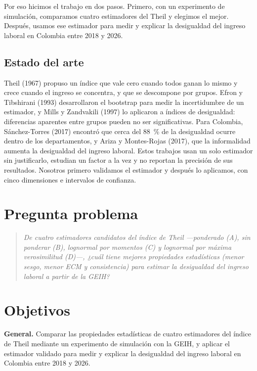 \documentclass[12pt,letterpaper]{article}
\begin{document}
Por eso hicimos el trabajo en dos pasos. Primero, con un experimento de simulación, comparamos cuatro estimadores del Theil y elegimos el mejor. Después, usamos ese estimador para medir y explicar la desigualdad del ingreso laboral en Colombia entre 2018 y 2026.

\subsection{Estado del arte}

Theil (1967) propuso un índice que vale cero cuando todos ganan lo mismo y crece cuando el ingreso se concentra, y que se descompone por grupos. Efron y Tibshirani (1993) desarrollaron el bootstrap para medir la incertidumbre de un estimador, y Mills y Zandvakili (1997) lo aplicaron a índices de desigualdad: diferencias aparentes entre grupos pueden no ser significativas. Para Colombia, Sánchez-Torres (2017) encontró que cerca del 88~\% de la desigualdad ocurre dentro de los departamentos, y Ariza y Montes-Rojas (2017), que la informalidad aumenta la desigualdad del ingreso laboral. Estos trabajos usan un solo estimador sin justificarlo, estudian un factor a la vez y no reportan la precisión de sus resultados. Nosotros primero validamos el estimador y después lo aplicamos, con cinco dimensiones e intervalos de confianza.

\section{Pregunta problema}

\begin{quote}
\emph{De cuatro estimadores candidatos del índice de Theil ---ponderado (A), sin ponderar (B), lognormal por momentos (C) y lognormal por máxima verosimilitud (D)---, ¿cuál tiene mejores propiedades estadísticas (menor sesgo, menor ECM y consistencia) para estimar la desigualdad del ingreso laboral a partir de la GEIH?}
\end{quote}

\section{Objetivos}

\textbf{General.} Comparar las propiedades estadísticas de cuatro estimadores del índice de Theil mediante un experimento de simulación con la GEIH, y aplicar el estimador validado para medir y explicar la desigualdad del ingreso laboral en Colombia entre 2018 y 2026.
\end{document}
